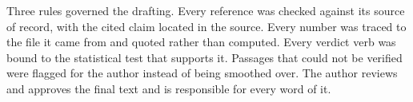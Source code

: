 Three rules governed the drafting. Every reference was checked against its source of
record, with the cited claim located in the source. Every number was traced to the file
it came from and quoted rather than computed. %
Every verdict verb was bound to the
statistical test that supports it. Passages that could not be verified were flagged for
the author instead of being smoothed over. The author reviews and approves the final
text and is responsible for every word of it.
